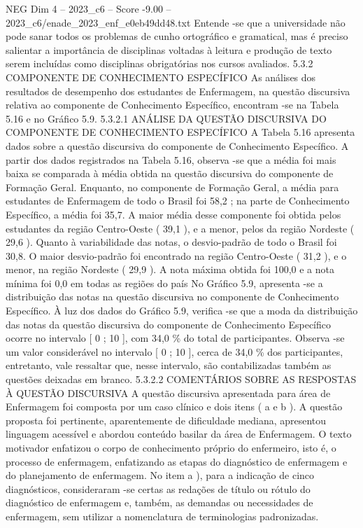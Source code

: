 \begin{textsample}{NEG Dim 4 – 2023\_c6 – Score -9.00 – 2023\_c6/enade\_2023\_enf\_e0eb49dd48.txt}
Entende -se que a universidade não pode sanar todos os problemas de cunho ortográfico e gramatical, mas é preciso salientar a importância de disciplinas voltadas à leitura e produção de texto serem incluídas como disciplinas obrigatórias nos cursos avaliados. 5.3.2 COMPONENTE DE CONHECIMENTO ESPECÍFICO As análises dos resultados de desempenho dos estudantes de Enfermagem, na questão discursiva relativa ao componente de Conhecimento Específico, encontram -se na Tabela 5.16 e no Gráfico 5.9. 5.3.2.1 ANÁLISE DA QUESTÃO DISCURSIVA DO COMPONENTE DE CONHECIMENTO ESPECÍFICO A Tabela 5.16 apresenta dados sobre a questão discursiva do componente de Conhecimento Específico.
A partir dos dados registrados na Tabela 5.16, observa -se que a média foi mais baixa se comparada à média obtida na questão discursiva do componente de Formação Geral.
Enquanto, no componente de Formação Geral, a média para estudantes de Enfermagem de todo o Brasil foi 58,2 ; na parte de Conhecimento Específico, a média foi 35,7.
A maior média desse componente foi obtida pelos estudantes da região Centro-Oeste ( 39,1 ), e a menor, pelos da região Nordeste ( 29,6 ).
Quanto à variabilidade das notas, o desvio-padrão de todo o Brasil foi 30,8.
O maior desvio-padrão foi encontrado na região Centro-Oeste ( 31,2 ), e o menor, na região Nordeste ( 29,9 ).
A nota máxima obtida foi 100,0 e a nota mínima foi 0,0 em todas as regiões do país No Gráfico 5.9, apresenta -se a distribuição das notas na questão discursiva no componente de Conhecimento Específico.
À luz dos dados do Gráfico 5.9, verifica -se que a moda da distribuição das notas da questão discursiva do componente de Conhecimento Específico ocorre no intervalo [ 0 ; 10 ], com 34,0 \% do total de participantes.
Observa -se um valor considerável no intervalo [ 0 ; 10 ], cerca de 34,0 \% dos participantes, entretanto, vale ressaltar que, nesse intervalo, são contabilizadas também as questões deixadas em branco. 5.3.2.2 COMENTÁRIOS SOBRE AS RESPOSTAS À QUESTÃO DISCURSIVA A questão discursiva apresentada para área de Enfermagem foi composta por um caso clínico e dois itens ( a e b ).
A questão proposta foi pertinente, aparentemente de dificuldade mediana, apresentou linguagem acessível e abordou conteúdo basilar da área de Enfermagem.
O texto motivador enfatizou o corpo de conhecimento próprio do enfermeiro, isto é, o processo de enfermagem, enfatizando as etapas do diagnóstico de enfermagem e do planejamento de enfermagem.
No item a ), para a indicação de cinco diagnósticos, consideraram -se certas as redações de título ou rótulo do diagnóstico de enfermagem e, também, as demandas ou necessidades de enfermagem, sem utilizar a nomenclatura de terminologias padronizadas.

\end{textsample}
